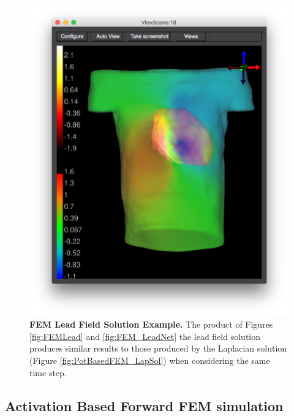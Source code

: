 \begin{figure}[H]
\begin{center}
\includegraphics[width=\textwidth]{ECGToolkitGuide_figures/PotBasedFEM_LeadSol.png}
\caption{{\bf FEM Lead Field Solution Example.} The product of Figures \ref{fig:FEMLead} and \ref{fig:FEM_LeadNet} the lead field solution produces similar results to those produced by the Laplacian solution (Figure \ref{fig:PotBasedFEM_LapSol}) when considering the same time step.}
\label{fig:FEM_LeadSol}
\end{center}
\end{figure}

\subsection{Activation Based Forward FEM simulation}


